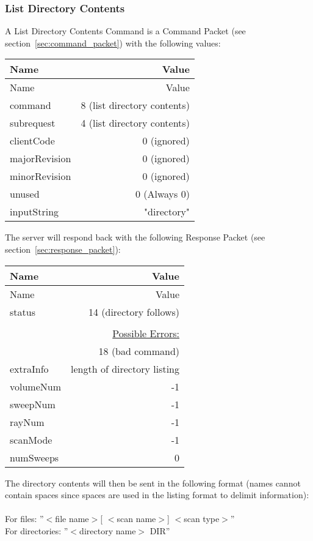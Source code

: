 \documentclass[10pt]{article}
\newcommand{\tblspc}{\rule{0pt}{3ex}}
\begin{document}
\subsubsection{List Directory Contents}
\label{sec:list_directory_contents}
A List Directory Contents Command is a Command Packet (see section~\ref{sec:command_packet}) with the following values:
\begin{longtable}{|l|r|}
\hline Name & Value \\ \hline \endfirsthead
\hline Name & Value \\ \hline \endhead
\hline \endfoot
\tblspc command & 8 (list directory contents) \\
\hline
\tblspc subrequest & 4 (list directory contents) \\
\hline
\tblspc clientCode & 0 (ignored) \\
\hline
\tblspc majorRevision & 0 (ignored) \\
\hline
\tblspc minorRevision & 0 (ignored) \\
\hline
\tblspc unused & 0 (Always 0) \\
\hline
\tblspc inputString & "directory" \\
\hline
\end{longtable}
\newpage

The server will respond back with the following Response Packet (see section~\ref{sec:response_packet}):
\begin{longtable}{|l|r|}
\hline Name & Value \\ \hline \endfirsthead
\hline Name & Value \\ \hline \endhead
\hline \endfoot
\tblspc status & 14 (directory follows) \\
& \\
& \underline{Possible Errors:} \\
& 18 (bad command) \\
\hline
\tblspc extraInfo & length of directory listing \\
\hline
\tblspc volumeNum & -1 \\
\hline
\tblspc sweepNum & -1 \\
\hline
\tblspc rayNum & -1 \\
\hline
\tblspc scanMode & -1 \\
\hline
\tblspc numSweeps & 0 \\
\hline
\end{longtable}

The directory contents will then be sent in the following format (names cannot contain spaces since spaces are used in the listing format to delimit information): \\\\
For files: ''$<$file name$>$[ $<$scan name$>$] $<$scan type$>$'' \\
For directories: ''$<$directory name$>$ DIR'' \\
\end{document}
